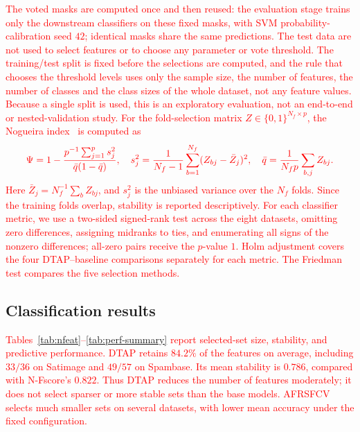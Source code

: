 \documentclass[]{interact}
\theoremstyle{plain}
\theoremstyle{definition}
\theoremstyle{remark}
\begin{document}
\leavevmode\textcolor{red}{The voted masks are computed once and then reused: the evaluation stage trains
only the downstream classifiers on these fixed masks, with SVM probability-calibration
seed $42$; identical masks share the same predictions. The test data are not used to select features or to choose any parameter or vote threshold.
The training/test split is fixed before the selections are computed, and the rule that chooses
the threshold levels uses only the sample size, the number of features, the number of classes
and the class sizes of the whole dataset, not any feature values. Because a single split is
used, this is an exploratory evaluation, not an end-to-end or nested-validation study.
For the fold-selection matrix $Z\in\{0,1\}^{N_f\times p}$, the Nogueira index~\citep{nogueira2018}
is computed as}
\[\textcolor{red}{
\Psi=1-\frac{p^{-1}\sum_{j=1}^{p}s_j^2}{\bar q(1-\bar q)},\quad
s_j^2=\frac{1}{N_f-1}\sum_{b=1}^{N_f}(Z_{bj}-\bar Z_j)^2,\quad
\bar q=\frac{1}{N_f p}\sum_{b,j}Z_{bj}.
}\]
\leavevmode\textcolor{red}{Here $\bar Z_j=N_f^{-1}\sum_b Z_{bj}$, and $s_j^2$ is the unbiased variance over the $N_f$
folds.
Since the training folds overlap, stability is reported descriptively.
For each classifier metric, we use a two-sided signed-rank test across the
eight datasets, omitting zero differences, assigning midranks to ties, and
enumerating all signs of the nonzero differences; all-zero pairs receive the $p$-value $1$.
Holm adjustment covers the four DTAP--baseline comparisons separately for
each metric. The Friedman test compares the five selection methods.}

\subsection{Classification results}\label{ssec:results}
\leavevmode\textcolor{red}{Tables~\ref{tab:nfeat}--\ref{tab:perf-summary} report selected-set size,
stability, and predictive performance. DTAP retains $84.2\%$ of the features
on average, including $33/36$ on Satimage and $49/57$ on Spambase.
Its mean stability is $0.786$, compared with N-Fscore's $0.822$.
Thus DTAP reduces the number of features moderately; it does not select sparser or more
stable sets than the base models. AFRSFCV selects much smaller sets on several datasets,
with lower mean accuracy under the fixed configuration.}
\end{document}
